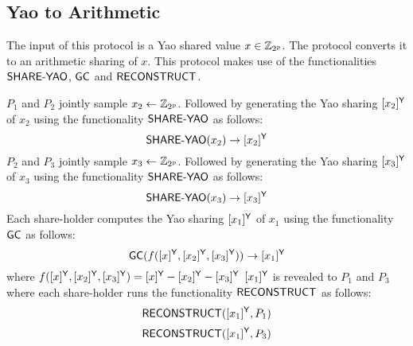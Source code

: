 \subsection{Yao to Arithmetic}
\begin{algorithm}[H]
\renewcommand{\thealgorithm}{}
\caption{$[x]^\Yao \rightarrow [x]^\Arithmetic$}
\label{protocol1}
The input of this protocol is a Yao shared value $x \in \mathbb{Z}_{2^p}$. The protocol converts it to an arithmetic sharing of $x$. This protocol makes use of the functionalities $\mathsf{SHARE\mbox{-}YAO}$, $\mathsf{GC}$ and $\mathsf{RECONSTRUCT}$.
\smallskip
\begin{algorithmic}[1]
\STATE $P_1$ and $P_2$ jointly sample $x_2 \leftarrow \mathbb{Z}_{2^p}$. Followed by generating the Yao sharing $[x_2]^{\mathsf{Y}}$ of $x_2$ using the functionality $\mathsf{SHARE\mbox{-}YAO}$ as follows:
\begin{equation*}
    \mathsf{SHARE\mbox{-}YAO}(x_2) \rightarrow [x_2]^{\mathsf{Y}}
\end{equation*}
\STATE $P_2$ and $P_3$ jointly sample $x_3 \leftarrow \mathbb{Z}_{2^p}$. Followed by generating the Yao sharing $[x_3]^{\mathsf{Y}}$ of $x_3$ using the functionality $\mathsf{SHARE\mbox{-}YAO}$ as follows:
\begin{equation*}
    \mathsf{SHARE\mbox{-}YAO}(x_3) \rightarrow [x_3]^{\mathsf{Y}}
\end{equation*}
\STATE Each share-holder computes the Yao sharing $[x_1]^{\mathsf{Y}}$ of $x_1$ using the functionality $\mathsf{GC}$ as follows:
\begin{equation*}
    \mathsf{GC}(f([x]^{\mathsf{Y}}, [x_2]^{\mathsf{Y}}, [x_3]^{\mathsf{Y}})) \rightarrow [x_1]^{\mathsf{Y}}
\end{equation*}
where $f([x]^{\mathsf{Y}}, [x_2]^{\mathsf{Y}}, [x_3]^{\mathsf{Y}}) = [x]^{\mathsf{Y}} - [x_2]^{\mathsf{Y}} - [x_3]^{\mathsf{Y}}$
\STATE $[x_1]^{\mathsf{Y}}$ is revealed to $P_1$ and $P_3$ where each share-holder runs the functionality $\mathsf{RECONSTRUCT}$ as follows:
\begin{equation*}
    \mathsf{RECONSTRUCT}([x_1]^{\mathsf{Y}}, P_1)
\end{equation*}
\begin{equation*}
    \mathsf{RECONSTRUCT}([x_1]^{\mathsf{Y}}, P_3)
\end{equation*}
\end{algorithmic}
\end{algorithm}


